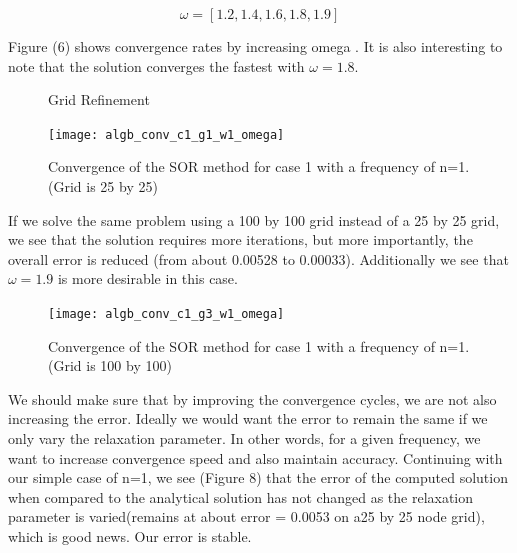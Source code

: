 \documentclass{article}
\begin{document}
\begin{equation}
\omega = [1.2,1.4,1.6,1.8,1.9] \nonumber
\end{equation}

\noindent Figure (6) shows convergence rates by increasing omega . It is also interesting to note that  the solution converges the fastest with $\omega = 1.8$.



\begin{figure}[H]
\centering
{}
\caption{Grid Refinement}
\end{figure}

\begin{figure}[H]
\centering
\texttt{[image: algb\_conv\_c1\_g1\_w1\_omega]}\label{Algebraic Convergence}
\caption{Convergence of the SOR method for case 1 with a frequency of n=1. (Grid is 25 by 25) }
\end{figure}

\noindent If we solve the same problem using a 100 by 100 grid instead of a 25 by 25 grid, we see that the solution requires more iterations, but more importantly, the overall error is reduced (from about 0.00528 to 0.00033). Additionally we see that $\omega = 1.9$ is more desirable in this case.

\begin{figure}[H]
\centering
\texttt{[image: algb\_conv\_c1\_g3\_w1\_omega]}\label{Algebraic Convergence}
\caption{Convergence of the SOR method for case 1 with a frequency of n=1. (Grid is 100 by 100)}
\end{figure}

\noindent We should make sure that by improving the convergence cycles, we are not also increasing the error. Ideally we would want the error to remain the same if we only vary the relaxation parameter. In other words, for a given frequency, we want to increase convergence speed and also maintain accuracy. Continuing with our simple case of n=1, we see (Figure 8) that the error of the computed solution when compared to the analytical solution has not changed  as the relaxation parameter is varied(remains at about error = 0.0053 on a25 by 25 node grid), which is good news. Our error is stable. 
\end{document}
